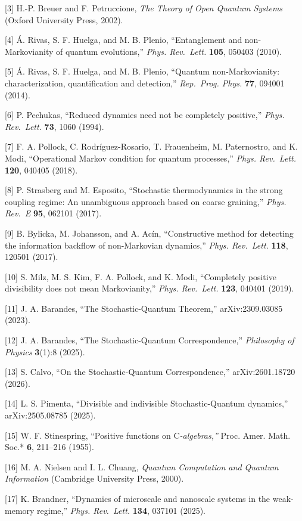 \documentclass[
]{article}
\begin{document}
{[}3{]} H.-P. Breuer and F. Petruccione, \emph{The Theory of Open
Quantum Systems} (Oxford University Press, 2002).

{[}4{]} Á. Rivas, S. F. Huelga, and M. B. Plenio, ``Entanglement and
non-Markovianity of quantum evolutions,'' \emph{Phys. Rev.~Lett.}
\textbf{105}, 050403 (2010).

{[}5{]} Á. Rivas, S. F. Huelga, and M. B. Plenio, ``Quantum
non-Markovianity: characterization, quantification and detection,''
\emph{Rep.~Prog. Phys.} \textbf{77}, 094001 (2014).

{[}6{]} P. Pechukas, ``Reduced dynamics need not be completely
positive,'' \emph{Phys. Rev.~Lett.} \textbf{73}, 1060 (1994).

{[}7{]} F. A. Pollock, C. Rodríguez-Rosario, T. Frauenheim, M.
Paternostro, and K. Modi, ``Operational Markov condition for quantum
processes,'' \emph{Phys. Rev.~Lett.} \textbf{120}, 040405 (2018).

{[}8{]} P. Strasberg and M. Esposito, ``Stochastic thermodynamics in the
strong coupling regime: An unambiguous approach based on coarse
graining,'' \emph{Phys. Rev.~E} \textbf{95}, 062101 (2017).

{[}9{]} B. Bylicka, M. Johansson, and A. Acín, ``Constructive method for
detecting the information backflow of non-Markovian dynamics,''
\emph{Phys. Rev.~Lett.} \textbf{118}, 120501 (2017).

{[}10{]} S. Milz, M. S. Kim, F. A. Pollock, and K. Modi, ``Completely
positive divisibility does not mean Markovianity,'' \emph{Phys.
Rev.~Lett.} \textbf{123}, 040401 (2019).

{[}11{]} J. A. Barandes, ``The Stochastic-Quantum Theorem,''
arXiv:2309.03085 (2023).

{[}12{]} J. A. Barandes, ``The Stochastic-Quantum Correspondence,''
\emph{Philosophy of Physics} \textbf{3}(1):8 (2025).

{[}13{]} S. Calvo, ``On the Stochastic-Quantum Correspondence,''
arXiv:2601.18720 (2026).

{[}14{]} L. S. Pimenta, ``Divisible and indivisible Stochastic-Quantum
dynamics,'' arXiv:2505.08785 (2025).

{[}15{]} W. F. Stinespring, ``Positive functions on C\emph{-algebras,''
}Proc. Amer. Math. Soc.* \textbf{6}, 211--216 (1955).

{[}16{]} M. A. Nielsen and I. L. Chuang, \emph{Quantum Computation and
Quantum Information} (Cambridge University Press, 2000).

{[}17{]} K. Brandner, ``Dynamics of microscale and nanoscale systems in
the weak-memory regime,'' \emph{Phys. Rev.~Lett.} \textbf{134}, 037101
(2025).
\end{document}
